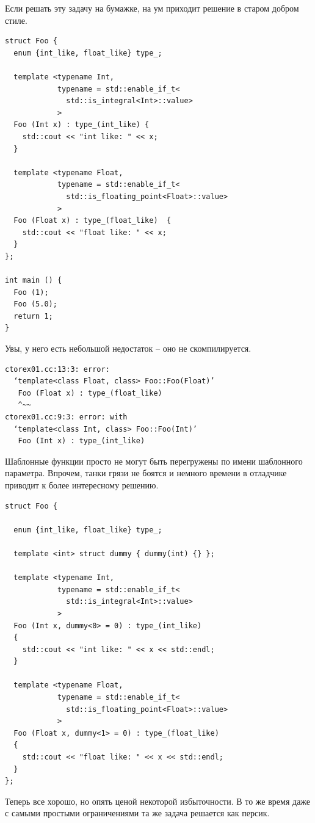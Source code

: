 \documentclass[a4paper,12pt,oneside]{article}
\begin{document}
Если решать эту задачу на бумажке, на ум приходит решение в старом добром стиле.

\begin{lstlisting}
struct Foo {
  enum {int_like, float_like} type_;

  template <typename Int, 
            typename = std::enable_if_t<
              std::is_integral<Int>::value>
            >
  Foo (Int x) : type_(int_like) { 
    std::cout << "int like: " << x; 
  }

  template <typename Float, 
            typename = std::enable_if_t<
              std::is_floating_point<Float>::value>
            >
  Foo (Float x) : type_(float_like)  { 
    std::cout << "float like: " << x; 
  }
};

int main () {
  Foo (1);
  Foo (5.0);
  return 1;
}
\end{lstlisting}

Увы, у него есть небольшой недостаток -- оно не скомпилируется.

\begin{verbatim}
ctorex01.cc:13:3: error: 
  ‘template<class Float, class> Foo::Foo(Float)’ 
   Foo (Float x) : type_(float_like)     
   ^~~
ctorex01.cc:9:3: error: with 
  ‘template<class Int, class> Foo::Foo(Int)’
   Foo (Int x) : type_(int_like)
\end{verbatim}

Шаблонные функции просто не могут быть перегружены по имени шаблонного параметра. Впрочем, танки грязи не боятся и немного времени в отладчике приводит к более интересному решению.

\begin{lstlisting}
struct Foo {

  enum {int_like, float_like} type_;

  template <int> struct dummy { dummy(int) {} };

  template <typename Int,
            typename = std::enable_if_t<
              std::is_integral<Int>::value>
            >
  Foo (Int x, dummy<0> = 0) : type_(int_like)
  {
    std::cout << "int like: " << x << std::endl;
  }

  template <typename Float,
            typename = std::enable_if_t<
              std::is_floating_point<Float>::value>
            >
  Foo (Float x, dummy<1> = 0) : type_(float_like)
  {
    std::cout << "float like: " << x << std::endl;
  }
};
\end{lstlisting}

Теперь все хорошо, но опять ценой некоторой избыточности. В то же время даже с самыми простыми ограничениями та же задача решается как персик.
\end{document}
